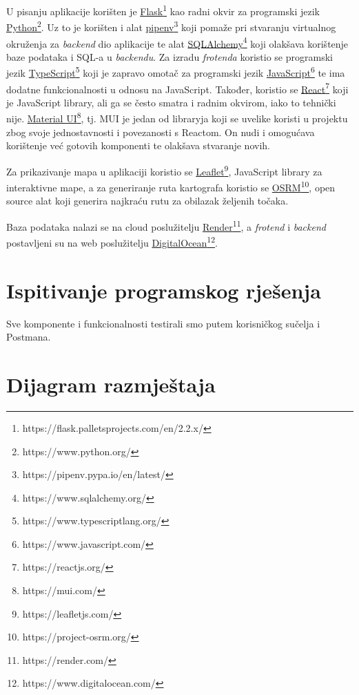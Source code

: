             U pisanju aplikacije korišten je  \underline{Flask}\footnote{https://flask.palletsprojects.com/en/2.2.x/} kao radni okvir za programski jezik \underline{Python}\footnote{https://www.python.org/}. Uz to je korišten i alat \underline{pipenv}\footnote{https://pipenv.pypa.io/en/latest/} koji pomaže pri stvaranju virtualnog okruženja za \textit{backend} dio aplikacije te alat \underline{SQLAlchemy}\footnote{https://www.sqlalchemy.org/} koji olakšava korištenje baze podataka i SQL-a u \textit{backendu}. Za izradu \textit{frotenda} koristio se programski jezik \underline{TypeScript}\footnote{https://www.typescriptlang.org/} koji je zapravo omotač za programski jezik \underline{JavaScript}\footnote{https://www.javascript.com/} te ima dodatne funkcionalnosti u odnosu na JavaScript. Također, koristio se \underline{React}\footnote{https://reactjs.org/} koji je JavaScript library, ali ga se često smatra i radnim okvirom, iako to tehnički nije. \underline{Material UI}\footnote{https://mui.com/}, tj. MUI je jedan od libraryja koji se uvelike koristi u projektu zbog svoje jednostavnosti i povezanosti s Reactom. On nudi i omogućava korištenje već gotovih komponenti te olakšava stvaranje novih. \par
            
            Za prikazivanje mapa u aplikaciji koristio se \underline{Leaflet}\footnote{https://leafletjs.com/}, JavaScript library za interaktivne mape, a za generiranje ruta kartografa koristio se \underline{OSRM}\footnote{https://project-osrm.org/}, open source alat koji generira najkraću rutu za obilazak željenih točaka.
            
            Baza podataka nalazi se na cloud poslužitelju \underline{Render}\footnote{https://render.com/}, a \textit{frotend} i \textit{backend}  postavljeni su na web poslužitelju \underline{DigitalOcean}\footnote{https://www.digitalocean.com/}. \par
			
			
			\eject 
		
	
		\section{Ispitivanje programskog rješenja}
		Sve komponente i funkcionalnosti testirali smo putem korisničkog sučelja i Postmana.
		
			\eject 
		
		
		\section{Dijagram razmještaja}
			
